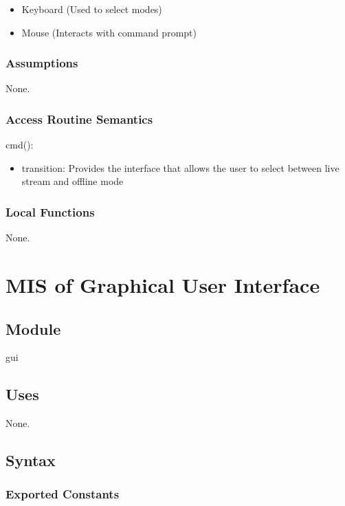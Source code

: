\documentclass[12pt, titlepage]{article}
\begin{document}
\begin{itemize}
  \item Keyboard (Used to select modes)
  \item Mouse (Interacts with command prompt)
\end{itemize}

\subsubsection{Assumptions}

None.

\subsubsection{Access Routine Semantics}

\noindent cmd():
\begin{itemize}
\item transition: Provides the interface that allows the user to select between live stream and offline mode 
\end{itemize}

\subsubsection{Local Functions}

None.

\newpage

\section{MIS of Graphical User Interface} \label{ModuleGUI} 

\subsection{Module}

gui

\subsection{Uses}

None.

\subsection{Syntax}

\subsubsection{Exported Constants}
\end{document}
